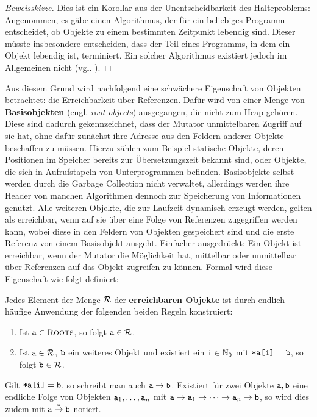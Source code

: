 \begin{proof}[Beweisskizze]
	Dies ist ein Korollar aus der Unentscheidbarkeit des Halteproblems:
	Angenommen, es gäbe einen Algorithmus, der für ein beliebiges Programm entscheidet, ob Objekte zu einem bestimmten Zeitpunkt lebendig sind.
	Dieser müsste insbesondere entscheiden, dass der Teil eines Programms, in dem ein Objekt lebendig ist, terminiert.
	Ein solcher Algorithmus existiert jedoch im Allgemeinen nicht (vgl. \cite[Kap. 4.2]{sipser}).
\end{proof}

Aus diesem Grund wird nachfolgend eine schwächere Eigenschaft von Objekten betrachtet: die Erreichbarkeit über Referenzen.
Dafür wird von einer Menge \Roots von \textbf{Basisobjekten} (engl. \textit{root objects}) ausgegangen, die nicht zum Heap gehören.
Diese sind dadurch gekennzeichnet, dass der Mutator unmittelbaren Zugriff auf sie hat, ohne dafür zunächst ihre Adresse aus den Feldern anderer Objekte beschaffen zu müssen.
Hierzu zählen zum Beispiel statische Objekte, deren Positionen im Speicher bereits zur Übersetzungszeit bekannt sind, oder Objekte, die sich in Aufrufstapeln von Unterprogrammen befinden.
Basisobjekte selbst werden durch die Garbage Collection nicht verwaltet, allerdings werden ihre Header von manchen Algorithmen dennoch zur Speicherung von Informationen genutzt.
Alle weiteren Objekte, die zur Laufzeit dynamisch erzeugt werden, gelten als erreichbar, wenn auf sie über eine Folge von Referenzen zugegriffen werden kann, wobei diese in den Feldern von Objekten gespeichert sind und die erste Referenz von einem Basisobjekt ausgeht.
Einfacher ausgedrückt: Ein Objekt ist erreichbar, wenn der Mutator die Möglichkeit hat, mittelbar oder unmittelbar über Referenzen auf das Objekt zugreifen zu können.
Formal wird diese Eigenschaft wie folgt definiert:

\begin{mybox}
\begin{defn}[Erreichbarkeit]
	\label{def:erreichbar}
	Jedes Element der Menge $\mathcal{R}$ der \textbf{erreichbaren Objekte} ist durch endlich häufige Anwendung der folgenden beiden Regeln konstruiert:
	\begin{enumerate}[(1)]
		\item Ist $\texttt{a} \in \textsc{Roots}$, so folgt $\texttt{a} \in \mathcal{R}$.
		\item Ist $\texttt{a} \in \mathcal{R}$, $\texttt{b}$ ein weiteres Objekt und existiert ein $\texttt{i} \in \mathbb{N}_0$ mit $\texttt{*a[i]} = \texttt{b}$, so folgt $\texttt{b} \in \mathcal{R}$.
	\end{enumerate}
	Gilt $\texttt{*a[i]} = \texttt{b}$, so schreibt man auch $\texttt{a} \rightarrow \texttt{b}$.
	Existiert für zwei Objekte $\texttt{a}, \texttt{b}$ eine endliche Folge von Objekten $\texttt{a}_1, \dots, \texttt{a}_n$ mit $\texttt{a} \rightarrow \texttt{a}_1 \rightarrow \dots \rightarrow \texttt{a}_n \rightarrow \texttt{b}$, so wird dies zudem mit $\texttt{a} \overset{*}{\rightarrow} \texttt{b}$ notiert.
\end{defn}
\end{mybox}

